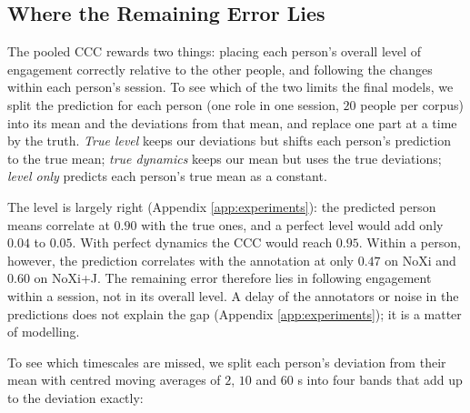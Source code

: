 \documentclass[10pt,a4paper,twocolumn]{article}
\begin{document}
	\subsection{Where the Remaining Error Lies}
	\label{sec:dynamics}
	The pooled CCC rewards two things: placing each person's overall level of engagement correctly relative to the other people, and following the changes within each person's session. To see which of the two limits the final models, we split the prediction for each person (one role in one session, $20$ people per corpus) into its mean and the deviations from that mean, and replace one part at a time by the truth. \emph{True level} keeps our deviations but shifts each person's prediction to the true mean; \emph{true dynamics} keeps our mean but uses the true deviations; \emph{level only} predicts each person's true mean as a constant.

	The level is largely right (Appendix \ref{app:experiments}): the predicted person means correlate at $0.90$ with the true ones, and a perfect level would add only $0.04$ to $0.05$. With perfect dynamics the CCC would reach $0.95$. Within a person, however, the prediction correlates with the annotation at only $0.47$ on NoXi and $0.60$ on NoXi+J. The remaining error therefore lies in following engagement within a session, not in its overall level. A delay of the annotators or noise in the predictions does not explain the gap (Appendix \ref{app:experiments}); it is a matter of modelling.

	To see which timescales are missed, we split each person's deviation from their mean with centred moving averages of $2$, $10$ and $60$ s into four bands that add up to the deviation exactly:
\end{document}
